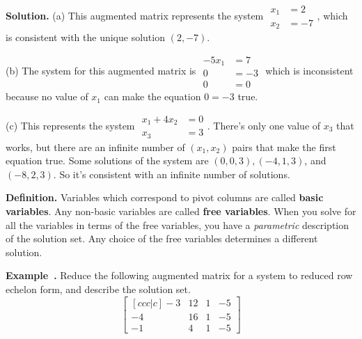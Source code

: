 \documentclass[11pt, letterpaper]{report}
\newenvironment{book}{}{}
\newcounter{example}[section]
\newcommand{\example}{\refstepcounter{example}%
\par\noindent\textbf{Example~\theexample.} }
\newenvironment{definition}{\begin{bbox}\par\noindent\textbf{Definition. }}
  {\end{bbox}}
\newlength\oldfboxsep%
\newlength\myminiwidth%
\newenvironment{bbox}{%
  \setlength\oldfboxsep\fboxsep
  \setlength{\fboxsep}{.1in}%
  \setlength\myminiwidth\linewidth%
  \addtolength\myminiwidth{-0.2in}%
  \vspace{0.1in}%
  \begin{lrbox}{\bboxbox}\begin{minipage}{\myminiwidth}%
    }{%
    \end{minipage}\end{lrbox}%
  \noindent\fbox{\usebox{\bboxbox}}\vspace{0.1in}\setlength\fboxsep\oldfboxsep%
}
\begin{document}
\begin{book}
\textbf{Solution.} (a) This augmented matrix represents the system $\begin{aligned}
x_1&=2 \\
x_2&=-7 
\end{aligned}$, which is consistent with the unique solution $(2,-7)$.

(b) The system for this augmented matrix is $\begin{aligned}
-5x_1&=7 \\
0 &= -3 \\
0 &= 0
\end{aligned}$ which is inconsistent because no value of $x_1$ can make the equation $0=-3$ true.

(c) This represents the system $\begin{aligned}
x_1+4x_2&=0 \\
x_3&=3
\end{aligned}$. There's only one value of $x_3$ that works, but there are an infinite number of $(x_1,x_2)$ pairs that make the first equation true. Some solutions of the system are $(0,0,3),(-4,1,3)$, and $(-8,2,3)$. So it's consistent with an infinite number of solutions. \blacksquare
\end{book}

\begin{definition}  
Variables which correspond to pivot columns are called \textbf{basic variables}. Any non-basic variables are called \textbf{free variables}. When you solve for all the variables in terms of the free variables, you have a \emph{parametric} description of the solution set. Any choice of the free variables determines a different solution.
\end{definition}

\example Reduce the following augmented matrix for a system to reduced row echelon form, and describe the solution set.
\[\begin{bmatrix}[ccc|c]
-3 & 12 & 1 & -5 \\
-4 & 16 & 1 & -5 \\
-1 & 4 & 1 & -5
\end{bmatrix}\]
\end{document}
